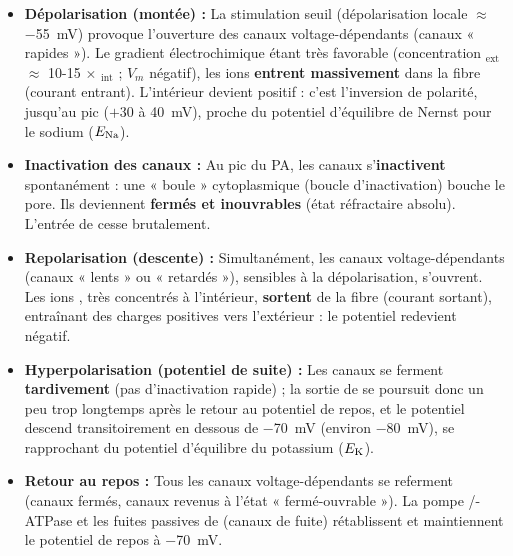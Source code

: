 \documentclass[11pt]{article}
\newcommand{\cle}[1]{{\popxbold\color{popdark}#1}}
\begin{document}
\begin{itemize}
\item \textbf{Dépolarisation (montée) :} La stimulation seuil (dépolarisation locale $\approx$ \SI{-55}{mV}) provoque l'ouverture des \cle{canaux  voltage-dépendants} (canaux « rapides »). Le gradient électrochimique étant très favorable (concentration $_{\text{ext}}$ $\approx$ 10-15 $\times$ $_{\text{int}}$ ; $V_m$ négatif), les ions  \textbf{entrent massivement} dans la fibre (courant entrant). L'intérieur devient positif : c'est l'inversion de polarité, jusqu'au pic ($+30$ à \SI{+40}{mV}), proche du potentiel d'équilibre de Nernst pour le sodium ($E_{\ce{Na}}$).
\item \textbf{Inactivation des canaux  :} Au pic du PA, les canaux  s'\textbf{inactivent} spontanément : une « boule » cytoplasmique (boucle d'inactivation) bouche le pore. Ils deviennent \textbf{fermés et inouvrables} (état réfractaire absolu). L'entrée de  cesse brutalement.
\item \textbf{Repolarisation (descente) :} Simultanément, les \cle{canaux  voltage-dépendants} (canaux « lents » ou « retardés »), sensibles à la dépolarisation, s'ouvrent. Les ions , très concentrés à l'intérieur, \textbf{sortent} de la fibre (courant sortant), entraînant des charges positives vers l'extérieur : le potentiel redevient négatif.
\item \textbf{Hyperpolarisation (potentiel de suite) :} Les canaux  se ferment \textbf{tardivement} (pas d'inactivation rapide) ; la sortie de  se poursuit donc un peu trop longtemps après le retour au potentiel de repos, et le potentiel descend transitoirement en dessous de \SI{-70}{mV} (environ \SI{-80}{mV}), se rapprochant du potentiel d'équilibre du potassium ($E_{\ce{K}}$).
\item \textbf{Retour au repos :} Tous les canaux voltage-dépendants se referment (canaux  fermés, canaux  revenus à l'état « fermé-ouvrable »). La pompe /-ATPase et les fuites passives de  (canaux de fuite) rétablissent et maintiennent le potentiel de repos à \SI{-70}{mV}.
\end{itemize}
\end{document}
